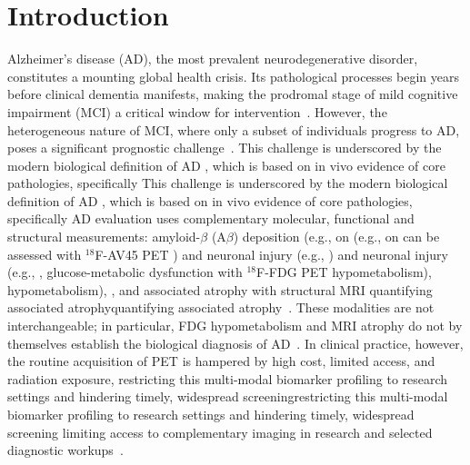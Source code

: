 \documentclass{article}
\providecommand{\DIFaddtex}[1]{{\protect\color{blue} \sf #1}} %
\providecommand{\DIFdeltex}[1]{{\protect\color{red} \ifmmode #1\else\scriptsize #1\fi}} %
\providecommand{\DIFaddbegin}{} %
\providecommand{\DIFaddend}{} %
\providecommand{\DIFdelbegin}{} %
\providecommand{\DIFdelend}{} %
\providecommand{\DIFadd}[1]{\texorpdfstring{\DIFaddtex{#1}}{#1}} %
\providecommand{\DIFdel}[1]{\texorpdfstring{\DIFdeltex{#1}}{}} %
\newcommand{\DIFscaledelfig}{0.5}
\newlength{\DIFdelgraphicswidth} %
\newlength{\DIFdelgraphicsheight} %
\newcommand{\DIFaddincludegraphics}[2][]{{\color{blue}\fbox{\DIFOincludegraphics[#1]{#2}}}} %
\newcommand{\DIFdelincludegraphics}[2][]{%
\sbox{\DIFdelgraphicsbox}{\DIFOincludegraphics[#1]{#2}}%
\settoboxwidth{\DIFdelgraphicswidth}{\DIFdelgraphicsbox} %
\settoboxtotalheight{\DIFdelgraphicsheight}{\DIFdelgraphicsbox} %
\scalebox{\DIFscaledelfig}{%
\parbox[b]{\DIFdelgraphicswidth}{\usebox{\DIFdelgraphicsbox}\\[-\baselineskip] \rule{\DIFdelgraphicswidth}{0em}}\llap{\resizebox{\DIFdelgraphicswidth}{\DIFdelgraphicsheight}{%
\setlength{\unitlength}{\DIFdelgraphicswidth}%
\begin{picture}(1,1)%
\thicklines\linethickness{2pt} %
{\color[rgb]{1,0,0}\put(0,0){\framebox(1,1){}}}%
{\color[rgb]{1,0,0}\put(0,0){\line( 1,1){1}}}%
{\color[rgb]{1,0,0}\put(0,1){\line(1,-1){1}}}%
\end{picture}%
}\hspace*{3pt}}} %
} %
\DeclareRobustCommand{\DIFaddbegin}{\DIFOaddbegin \let\includegraphics\DIFaddincludegraphics} %
\DeclareRobustCommand{\DIFaddend}{\DIFOaddend \let\includegraphics\DIFOincludegraphics} %
\DeclareRobustCommand{\DIFdelbegin}{\DIFOdelbegin \let\includegraphics\DIFdelincludegraphics} %
\DeclareRobustCommand{\DIFdelend}{\DIFOaddend \let\includegraphics\DIFOincludegraphics} %
\begin{document}
\section{Introduction}
Alzheimer's disease (AD), the most prevalent neurodegenerative disorder, constitutes a mounting global health crisis. Its pathological processes begin years before clinical dementia manifests, making the prodromal stage of mild cognitive impairment (MCI) a critical window for intervention~\cite{scheltens2021alzheimer}. However, the heterogeneous nature of MCI, where only a subset of individuals progress to AD, poses a significant prognostic challenge~\cite{haller2023neuroimaging}. \DIFdelbegin \DIFdel{This challenge is underscored by the modern biological definition of AD , which is based on in vivo evidence of core pathologies, specifically }\DIFdelend \DIFaddbegin \DIFadd{AD evaluation uses complementary molecular, functional and structural measurements: }\DIFaddend amyloid-$\beta$ (A$\beta$) deposition \DIFdelbegin \DIFdel{(e.g., on }\DIFdelend \DIFaddbegin \DIFadd{can be assessed with }\DIFaddend $^{18}$F-AV45 PET\DIFdelbegin \DIFdel{) and neuronal injury (e.g., }\DIFdelend \DIFaddbegin \DIFadd{, glucose-metabolic dysfunction with }\DIFaddend $^{18}$F-FDG PET\DIFdelbegin \DIFdel{hypometabolism), }\DIFdelend \DIFaddbegin \DIFadd{, and associated atrophy }\DIFaddend with structural MRI\DIFdelbegin \DIFdel{quantifying associated atrophy}\DIFdelend ~\cite{ossenkoppele2022amyloid,yan2021sex,haller2023neuroimaging}. \DIFaddbegin \DIFadd{These modalities are not interchangeable; in particular, FDG hypometabolism and MRI atrophy do not by themselves establish the biological diagnosis of AD~\cite{jack2024revised}. }\DIFaddend In clinical practice, however, the routine acquisition of PET is hampered by high cost, limited access, and radiation exposure, \DIFdelbegin \DIFdel{restricting this multi-modal biomarker profiling to research settings and hindering timely, widespread screening}\DIFdelend \DIFaddbegin \DIFadd{limiting access to complementary imaging in research and selected diagnostic workups}\DIFaddend ~\cite{nordberg2010use}.
\end{document}
